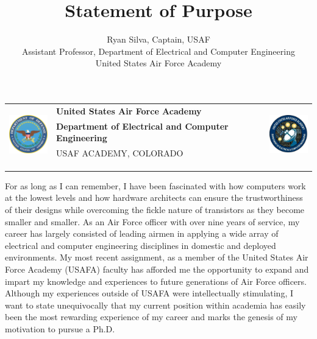 \documentclass{article}
\begin{document}
\noindent \begin{tabu} to \textwidth{l X[c] r}
 & 
\textbf{United States Air Force Academy} &  
\\
& \textbf{Department of Electrical and Computer Engineering} & \\
& \tiny{USAF ACADEMY, COLORADO}\\
\\ \\ \\
\end{tabu}

\title{Statement of Purpose}
\author{Ryan Silva, Captain, USAF\\Assistant Professor, Department of
Electrical and Computer Engineering\\United States Air Force Academy}
\date{}
{\let\newpage\relax\maketitle}

For as long as I can remember, I have been fascinated with how computers work
at the lowest levels and how hardware architects can ensure the trustworthiness
of their designs while overcoming the
fickle nature of transistors as they become smaller and smaller. 
As an Air Force officer with over nine years of service, my career has largely consisted of
leading airmen in applying a wide array of electrical and computer
engineering disciplines in domestic and deployed environments. My most
recent assignment, as a member of the United States Air Force 
Academy (USAFA) faculty has afforded me the opportunity to expand and impart my knowledge and
experiences to future generations of Air Force officers. Although my
experiences outside of USAFA were
intellectually stimulating, I want to state
unequivocally that my current position within academia has easily been the most
rewarding experience of my career and marks the genesis of my motivation to pursue
a Ph.D. 
\end{document}
